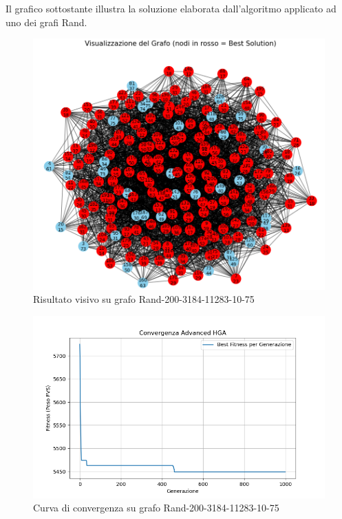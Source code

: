 \documentclass[12pt,a4paper,twoside]{article}
\begin{document}
\bigskip
\noindent Il grafico sottostante illustra la soluzione elaborata dall'algoritmo applicato ad uno dei grafi Rand.
\begin{figure}[H] 
    \centering
    \caption{Risultato visivo su grafo Rand-200-3184-11283-10-75}
    \includegraphics[width=\textwidth]{Screenshot 2025-03-03 210242.png} 
\end{figure}
\clearpage
\begin{figure}[H] 
    \centering
    \caption{Curva di convergenza su grafo Rand-200-3184-11283-10-75}
    \includegraphics[width=\textwidth]{convergence.png} 
\end{figure}
\end{document}
